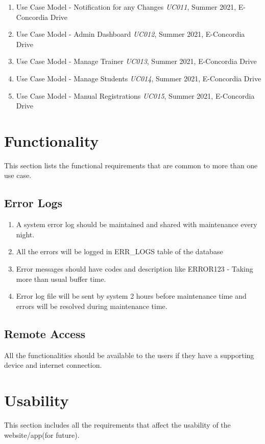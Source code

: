 \documentclass{article}
\begin{document}
\begin{enumerate}
    \item {\footnotesize Use Case Model - Notification for any Changes \textit{UC011}, Summer 2021, E-Concordia Drive}
    \item {\footnotesize Use Case Model - Admin Dashboard \textit{UC012}, Summer 2021, E-Concordia Drive}
    \item {\footnotesize Use Case Model - Manage Trainer \textit{UC013}, Summer 2021, E-Concordia Drive}
    \item {\footnotesize Use Case Model - Manage Students \textit{UC014}, Summer 2021, E-Concordia Drive}
    \item {\footnotesize Use Case Model - Manual Registrations \textit{UC015}, Summer 2021, E-Concordia Drive}
    
\end{enumerate}

\section{ Functionality}
This section lists the functional requirements that are common to more than one use case.
\subsection{Error Logs}
\begin{enumerate}
    \item A system error log should be maintained and shared with maintenance every night.
    \item All the errors will be logged in ERR\_LOGS table of the database 
    \item Error messages should have codes and description like ERROR123 - Taking more than usual buffer time.
    \item Error log file will be sent by system 2 hours before maintenance time and errors will be resolved during maintenance time.
\end{enumerate}

\subsection{Remote Access}
All the functionalities should be available to the users if they have a supporting device and internet connection.

\section{ Usability}
This section includes all the requirements that affect the usability of the website/app(for future).
\end{document}
